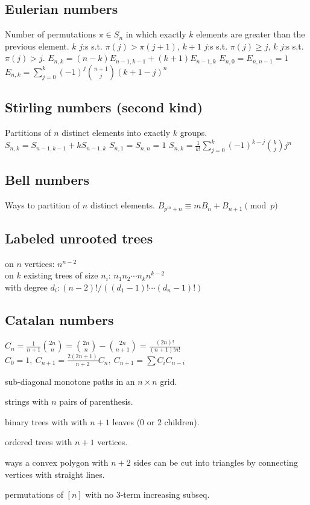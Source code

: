 	\subsection{Eulerian numbers}
		Number of permutations $\pi \in S_n$ in which exactly $k$ elements are greater than the previous element. $k$ $j$:s s.t. $\pi(j)>\pi(j+1)$, $k+1$ $j$:s s.t. $\pi(j)\geq j$, $k$ $j$:s s.t. $\pi(j)>j$.
		$E_{n,k} = (n-k)E_{n-1,k-1} + (k+1)E_{n-1,k}$
		$E_{n,0} = E_{n,n-1} = 1$
		$E_{n,k} = \sum_{j=0}^k(-1)^j\binom{n+1}{j}(k+1-j)^n$

	\subsection{Stirling numbers (second kind)}
		Partitions of $n$ distinct elements into exactly $k$ groups.
		$S_{n,k} = S_{n-1,k-1} + k S_{n-1,k}$
		$S_{n,1} = S_{n,n} = 1$
		$S_{n,k} = \frac{1}{k!}\sum_{j=0}^k (-1)^{k-j}\binom{k}{j}j^n$

	\subsection{Bell numbers}
		Ways to partition of $n$ distinct elements. 
		$B_{p^m+n}\equiv mB_{n}+B_{n+1} \pmod{p}$

	\subsection{Labeled unrooted trees}
		on $n$ vertices: $n^{n-2}$ \\
		on $k$ existing trees of size $n_i$: $n_1n_2\cdots n_k n^{k-2}$ \\
		with degree $d_i: (n-2)! / ((d_1-1)! \cdots (d_n-1)!)$

	\subsection{Catalan numbers}
		$C_n=\frac{1}{n+1}\binom{2n}{n}= \binom{2n}{n}-\binom{2n}{n+1} = \frac{(2n)!}{(n+1)!n!}$
		$ C_0=1,\ C_{n+1} = \frac{2(2n+1)}{n+2}C_n,\ C_{n+1}=\sum C_iC_{n-i}$
		\begin{itemize*}[noitemsep]
			\item sub-diagonal monotone paths in an $n\times n$ grid.
			\item strings with $n$ pairs of parenthesis.
			\item binary trees with with $n+1$ leaves (0 or 2 children).
			\item ordered trees with $n+1$ vertices.
			\item ways a convex polygon with $n+2$ sides can be cut into triangles by connecting vertices with straight lines.
			\item permutations of $[n]$ with no 3-term increasing subseq.
		\end{itemize*}
